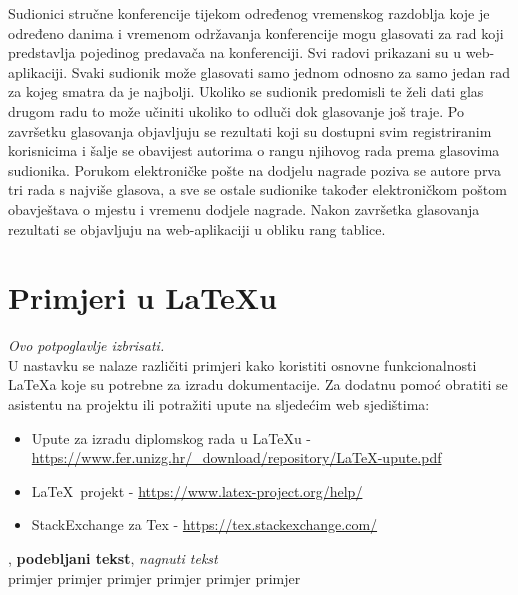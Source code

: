 		Sudionici stručne konferencije tijekom određenog vremenskog razdoblja koje je određeno danima i vremenom održavanja konferencije mogu glasovati za rad koji predstavlja pojedinog predavača na konferenciji. Svi radovi prikazani su u web-aplikaciji. Svaki sudionik može glasovati samo jednom odnosno za samo jedan rad za kojeg smatra da je najbolji. Ukoliko se sudionik predomisli te želi dati glas drugom radu to može učiniti ukoliko to odluči dok glasovanje još traje. Po završetku glasovanja objavljuju se rezultati koji su dostupni svim registriranim korisnicima i šalje se obavijest autorima o rangu njihovog rada prema glasovima sudionika. Porukom elektroničke pošte na dodjelu nagrade poziva se autore prva tri rada s najviše glasova, a sve se ostale sudionike također elektroničkom poštom obavještava o mjestu i vremenu dodjele nagrade. Nakon završetka glasovanja rezultati se objavljuju na web-aplikaciji u obliku rang tablice.
		
		\eject
		
		\section{Primjeri u \LaTeX u}
		
		\textit{Ovo potpoglavlje izbrisati.}\\

		U nastavku se nalaze različiti primjeri kako koristiti osnovne funkcionalnosti \LaTeX a koje su potrebne za izradu dokumentacije. Za dodatnu pomoć obratiti se asistentu na projektu ili potražiti upute na sljedećim web sjedištima:
		\begin{itemize}
			\item Upute za izradu diplomskog rada u \LaTeX u - \url{https://www.fer.unizg.hr/_download/repository/LaTeX-upute.pdf}
			\item \LaTeX\ projekt - \url{https://www.latex-project.org/help/}
			\item StackExchange za Tex - \url{https://tex.stackexchange.com/}\\
		
		\end{itemize} 	


		
		\noindent {}, \textbf{podebljani tekst}, 	\textit{nagnuti tekst}\\
		\noindent \normalsize primjer \large primjer \Large primjer \LARGE {primjer} \huge {primjer} \Huge primjer \normalsize
				
